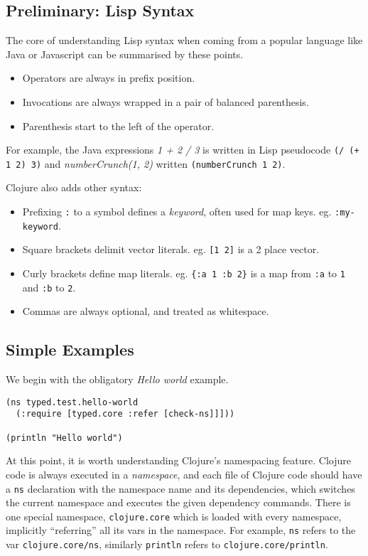 \subsection{Preliminary: Lisp Syntax}

The core of understanding Lisp syntax when coming from a popular language
like Java or Javascript can be summarised by these points.

\begin{itemize}
  \item Operators are always in prefix position.
  \item Invocations are always wrapped in a pair of balanced parenthesis.
  \item Parenthesis start to the left of the operator.
\end{itemize}

For example, the Java expressions \emph{1 + 2 / 3} is written in Lisp pseudocode \lstinline|(/ (+ 1 2) 3)|
and \emph{numberCrunch(1, 2)} written \lstinline|(numberCrunch 1 2)|.

Clojure also adds other syntax:

\begin{itemize}
  \item Prefixing \lstinline|:| to a symbol defines a \emph{keyword}, often used for map keys. eg. \lstinline|:my-keyword|.
  \item Square brackets delimit vector literals. eg. \lstinline|[1 2]| is a 2 place vector.
  \item Curly brackets define map literals. eg. \lstinline|{:a 1 :b 2}| is a map from 
        \lstinline|:a| to \lstinline|1| and \lstinline|:b| to \lstinline|2|.
  \item Commas are always optional, and treated as whitespace.
\end{itemize}

\subsection{Simple Examples}

We begin with the obligatory \emph{Hello world} example.

\begin{lstlisting}[caption=Typed Hello world, label=lst:helloworld]
(ns typed.test.hello-world
  (:require [typed.core :refer [check-ns]]]))

(println "Hello world")
\end{lstlisting}

At this point, it is worth understanding Clojure's namespacing feature.
Clojure code is always executed in a \emph{namespace}, and each file of Clojure code should 
have a \lstinline|ns| declaration with the namespace name and its dependencies,
which switches the current namespace and executes the given dependency commands.
There is one special namespace, \lstinline|clojure.core| which is
loaded with every namespace, implicitly ``referring'' all its vars in the namespace.
For example, \lstinline|ns| refers to the var \lstinline|clojure.core/ns|,
similarly \lstinline|println| refers to \lstinline|clojure.core/println|.

